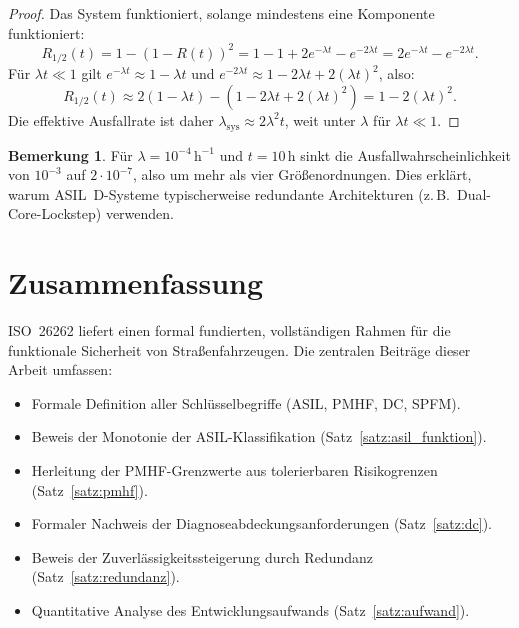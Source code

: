 ﻿\documentclass[a4paper,12pt]{article}
\theoremstyle{definition}
\newtheorem{bemerkung}{Bemerkung}
\begin{document}
\begin{proof}
  Das System funktioniert, solange mindestens eine Komponente
  funktioniert:
  \[
    R_{1/2}(t)
    = 1 - (1-R(t))^2
    = 1 - 1 + 2e^{-\lambda t} - e^{-2\lambda t}
    = 2e^{-\lambda t} - e^{-2\lambda t}.
  \]
  Für $\lambda t \ll 1$ gilt
  $e^{-\lambda t} \approx 1 - \lambda t$ und
  $e^{-2\lambda t} \approx 1 - 2\lambda t + 2(\lambda t)^2$, also:
  \[
    R_{1/2}(t)
    \approx 2(1-\lambda t) - (1-2\lambda t + 2(\lambda t)^2)
    = 1 - 2(\lambda t)^2.
  \]
  Die effektive Ausfallrate ist daher
  $\lambda_{\mathrm{sys}} \approx 2\lambda^2 t$,
  weit unter $\lambda$ für $\lambda t \ll 1$.
\end{proof}

\begin{bemerkung}
  Für $\lambda = 10^{-4}\,\mathrm{h}^{-1}$ und $t = 10\,\mathrm{h}$
  sinkt die Ausfallwahrscheinlichkeit von $10^{-3}$ auf
  $2 \cdot 10^{-7}$, also um mehr als vier Größenordnungen.
  Dies erklärt, warum ASIL~D-Systeme typischerweise redundante
  Architekturen (z.\,B.\ Dual-Core-Lockstep) verwenden.
\end{bemerkung}

\section{Zusammenfassung}

ISO~26262 liefert einen formal fundierten, vollständigen Rahmen für
die funktionale Sicherheit von Straßenfahrzeugen. Die zentralen
Beiträge dieser Arbeit umfassen:

\begin{itemize}
  \item Formale Definition aller Schlüsselbegriffe
        (ASIL, PMHF, DC, SPFM).
  \item Beweis der Monotonie der ASIL-Klassifikation
        (Satz~\ref{satz:asil_funktion}).
  \item Herleitung der PMHF-Grenzwerte aus tolerierbaren
        Risikogrenzen (Satz~\ref{satz:pmhf}).
  \item Formaler Nachweis der Diagnoseabdeckungsanforderungen
        (Satz~\ref{satz:dc}).
  \item Beweis der Zuverlässigkeitssteigerung durch Redundanz
        (Satz~\ref{satz:redundanz}).
  \item Quantitative Analyse des Entwicklungsaufwands
        (Satz~\ref{satz:aufwand}).
\end{itemize}
\end{document}
